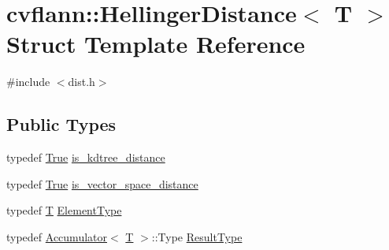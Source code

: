 \hypertarget{structcvflann_1_1HellingerDistance}{\section{cvflann\-:\-:Hellinger\-Distance$<$ T $>$ Struct Template Reference}
\label{structcvflann_1_1HellingerDistance}
}


{\ttfamily \#include $<$dist.\-h$>$}

\subsection*{Public Types}
\begin{DoxyCompactItemize}
\item 
typedef \hyperlink{classcvflann_1_1True}{True} \hyperlink{structcvflann_1_1HellingerDistance_aeae75a5a68fe211e7ee909f3a90e93d3}{is\-\_\-kdtree\-\_\-distance}
\item 
typedef \hyperlink{classcvflann_1_1True}{True} \hyperlink{structcvflann_1_1HellingerDistance_ab5f54b4b04397ad6a581c55576bf16af}{is\-\_\-vector\-\_\-space\-\_\-distance}
\item 
typedef \hyperlink{calib3d_8hpp_a3efb9551a871ddd0463079a808916717}{T} \hyperlink{structcvflann_1_1HellingerDistance_a3b4b98376064e5051537fb2ec044f18c}{Element\-Type}
\item 
typedef \hyperlink{structcvflann_1_1Accumulator}{Accumulator}$<$ \hyperlink{calib3d_8hpp_a3efb9551a871ddd0463079a808916717}{T} $>$\-::Type \hyperlink{structcvflann_1_1HellingerDistance_a5ea5bc129fed2c06da92c75586ef5833}{Result\-Type}
\end{DoxyCompactItemize}
